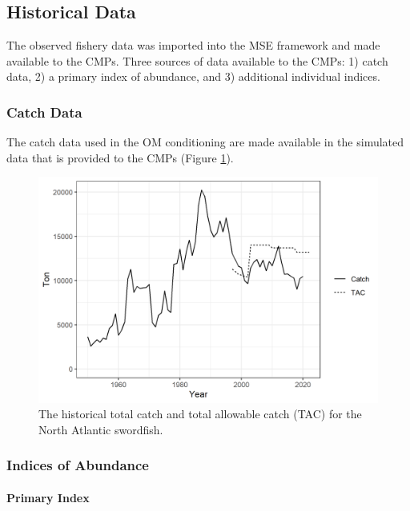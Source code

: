 \documentclass[
]{article}
\begin{document}
\hypertarget{historical-data}{%
\subsection{Historical Data}\label{historical-data}}

The observed fishery data was imported into the MSE framework and made available to the CMPs. Three sources of data available to the CMPs: 1) catch data, 2) a primary index of abundance, and 3) additional individual indices.

\hypertarget{catch-data}{%
\subsubsection{Catch Data}\label{catch-data}}

The catch data used in the OM conditioning are made available in the simulated data that is provided to the CMPs (Figure \ref{fig:catch-plot}).

\begin{figure}
\centering
\includegraphics{../../img/Catch_TAC.png}
\caption{\label{fig:catch-plot} The historical total catch and total allowable catch (TAC) for the North Atlantic swordfish.}
\end{figure}

\hypertarget{indices-of-abundance}{%
\subsubsection{Indices of Abundance}\label{indices-of-abundance}}

\hypertarget{primary-index}{%
\paragraph{Primary Index}\label{primary-index}}
\end{document}
